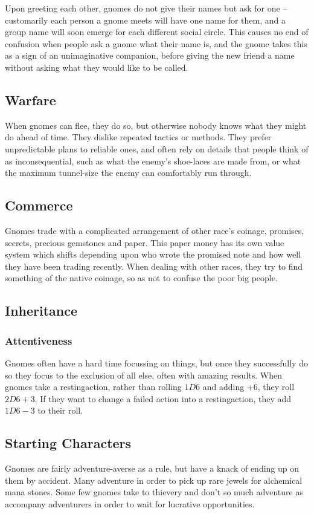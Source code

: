 \begin{multicols}{2}
Upon greeting each other, gnomes do not give their names but ask for one -- customarily each person a gnome meets will have one name for them, and a group name will soon emerge for each different social circle. This causes no end of confusion when people ask a gnome what their name is, and the gnome takes this as a sign of an unimaginative companion, before giving the new friend a name without asking what they would like to be called.

\subsection{Warfare}

When gnomes can flee, they do so, but otherwise nobody knows what they might do ahead of time.
They dislike repeated tactics or methods.
They prefer unpredictable plans to reliable ones, and often rely on details that people think of as inconsequential, such as what the enemy's shoe-laces are made from, or what the maximum tunnel-size the enemy can comfortably run through.

\subsection{Commerce}

Gnomes trade with a complicated arrangement of other race's coinage, promises, secrets, precious gemstones and paper. This paper money has its own value system which shifts depending upon who wrote the promised note and how well they have been trading recently. When dealing with other races, they try to find something of the native coinage, so as not to confuse the poor big people.

\subsection{Inheritance}

\subsubsection{Attentiveness}

Gnomes often have a hard time focussing on things, but once they successfully do so they focus to the exclusion of all else, often with amazing results.
When gnomes take a \gls{restingaction}, rather than rolling $1D6$ and adding +6, they roll $2D6+3$.
If they want to change a failed action into a \gls{restingaction}, they add $1D6-3$ to their roll.

\subsection{Starting Characters}
Gnomes are fairly adventure-averse as a rule, but have a knack of ending up on them by accident. Many adventure in order to pick up rare jewels for alchemical mana stones. Some few gnomes take to thievery and don't so much adventure as accompany adventurers in order to wait for lucrative opportunities.

\end{multicols}

